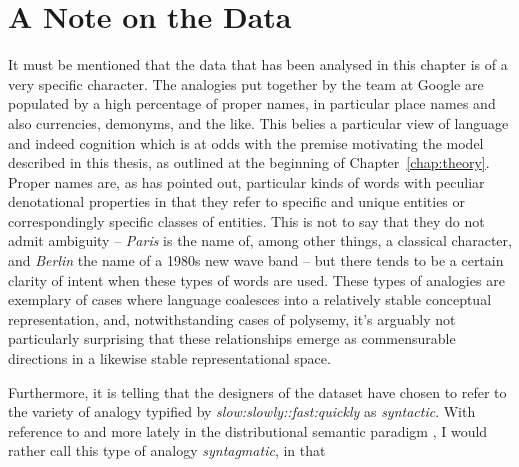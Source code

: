 \section{A Note on the Data}
It must be mentioned that the data that has been analysed in this chapter is of a very specific character.  The analogies put together by the team at Google are populated by a high percentage of proper names, in particular place names and also currencies, demonyms, and the like.  This belies a particular view of language and indeed cognition which is at odds with the premise motivating the model described in this thesis, as outlined at the beginning of Chapter~\ref{chap:theory}.  Proper names are, as \cite{Russell} has pointed out, particular kinds of words with peculiar denotational properties in that they refer to specific and unique entities or correspondingly specific classes of entities.  This is not to say that they do not admit ambiguity -- \emph{Paris} is the name of, among other things, a classical character, and \emph{Berlin} the name of a 1980s new wave band -- but there tends to be a certain clarity of intent when these types of words are used.  These types of analogies are exemplary of cases where language coalesces into a relatively stable conceptual representation, and, notwithstanding cases of polysemy, it's arguably not particularly surprising that these relationships emerge as commensurable directions in a likewise stable representational space.

Furthermore, it is telling that the designers of the dataset have chosen to refer to the variety of analogy typified by \emph{slow:slowly::fast:quickly} as \emph{syntactic}.  With reference to \cite{Saussure} and more lately in the distributional semantic paradigm \cite{Sahlgren}, I would rather call this type of analogy \emph{syntagmatic}, in that 
